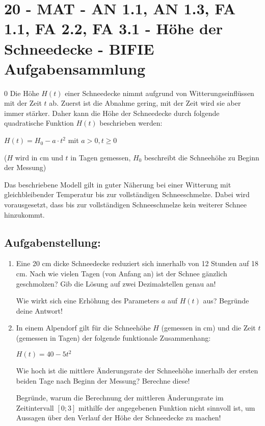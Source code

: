 \section{20 - MAT - AN 1.1, AN 1.3, FA 1.1, FA 2.2, FA 3.1 - Höhe der Schneedecke - BIFIE Aufgabensammlung}

\begin{langesbeispiel} \item[0] %
				Die Höhe $H(t)$ einer Schneedecke nimmt aufgrund von Witterungseinflüssen mit der Zeit $t$ ab. Zuerst ist die Abnahme gering, mit der Zeit wird sie aber immer stärker. Daher kann die Höhe der Schneedecke durch folgende quadratische Funktion $H(t)$ beschrieben werden:
				\begin{center} $H(t)=H_0-a\cdot t^2$ mit $a>0,t\geq 0$\end{center}
($H$ wird in cm und $t$ in Tagen gemessen, $H_0$ beschreibt die Schneehöhe zu Beginn der Messung)

Das beschriebene Modell gilt in guter Näherung bei einer Witterung mit gleichbleibender Temperatur bis zur vollständigen Schneeschmelze. Dabei wird vorausgesetzt, dass bis zur vollständigen Schneeschmelze kein weiterer Schnee hinzukommt.

\subsection{Aufgabenstellung:}
\begin{enumerate}
	\item Eine 20 cm dicke Schneedecke reduziert sich innerhalb von 12 Stunden auf 18 cm. Nach wie vielen Tagen (von Anfang an) ist der Schnee gänzlich geschmolzen? Gib die Lösung auf zwei Dezimalstellen genau an! 
	
Wie wirkt sich eine Erhöhung des Parameters $a$ auf $H(t)$ aus? Begründe deine Antwort! 

\item In einem Alpendorf gilt für die Schneehöhe $H$ (gemessen in cm) und die Zeit $t$ (gemessen in Tagen) der folgende funktionale Zusammenhang:
\begin{center}$H(t)=40-5t^2$\end{center}
Wie hoch ist die mittlere Änderungsrate der Schneehöhe innerhalb der ersten beiden Tage nach Beginn der Messung? Berechne diese!

Begründe, warum die Berechnung der mittleren Änderungsrate im Zeitintervall $[0; 3]$ mithilfe der angegebenen Funktion nicht sinnvoll ist, um Aussagen über den Verlauf der Höhe der Schneedecke zu machen!     
	

\end{enumerate}
\end{langesbeispiel}
